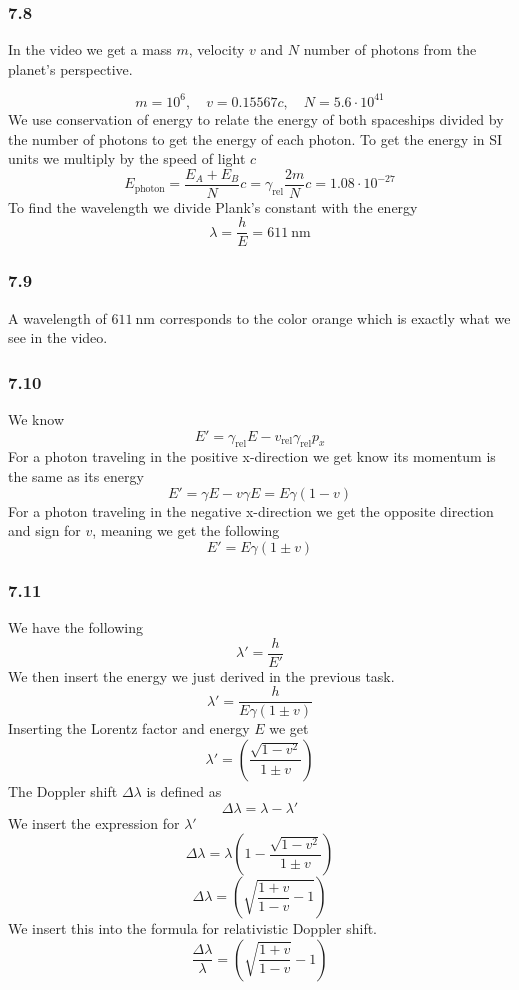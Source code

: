 \documentclass[reprint,english,notitlepage]{revtex4-2}
\begin{document}
\subsubsection*{7.8}
In the video we get a mass $ m $, velocity $ v $ and $ N $ number of photons from the planet's perspective. 

\[
m = 10^{6}, \quad v = 0.15567 c, \quad N = 5.6 ⋅ 10^{41}
\]
We use conservation of energy to relate the energy of both spaceships divided by the number of photons to get the energy of each photon. To get the energy in SI units we multiply by the speed of light $ c $
\[
E_{\text{photon}} = \frac{E_{A} + E_{B}}{N} c = γ_{\text{rel}} \frac{2m}{N}c = 1.08 ⋅ 10^{-27}
\]
To find the wavelength we divide Plank's constant with the energy 
\[
λ = \frac{h}{E} = 611\ \text{nm}
\]

\subsubsection*{7.9}
A wavelength of $  611\ \text{nm} $ corresponds to the color orange which is exactly what we see in the video.

\subsubsection*{7.10}
We know
\[
E' = γ_{\text{rel}}E - v_{\text{rel}} γ_{\text{rel}} p_{x}
\]
For a photon traveling in the positive x-direction we get know its momentum is the same as its energy
\[
E' = γE - v γ E = E γ(1 - v)
\]
For a photon traveling in the negative x-direction we get the opposite direction and sign for $ v $, meaning we get the following
\[
E' = E γ(1 ± v)
\]

\subsubsection*{7.11}
We have the following 
\[
λ' = \frac{h}{E'}
\]
We then insert the energy we just derived in the previous task. 
\[
λ' = \frac{h}{E γ(1 \pm v)}
\]
Inserting the Lorentz factor and energy $ E $ we get 
\[
λ' = \left( \frac{\sqrt{1 - v^{2}} }{1 \pm v} \right) 
\]
The Doppler shift $ Δλ $ is defined as
\[
Δλ = λ - λ' 
\]
We insert the expression for $ λ' $
\[
Δλ = λ\left( 1 - \frac{\sqrt{1 - v^{2}} }{1 \pm v} \right) 
\]
\[
Δλ = \left( \sqrt{\frac{1 + v}{1 - v} - 1}  \right) 
\]
We insert this into the formula for relativistic Doppler shift. 
\[
\frac{Δλ}{λ} = \left( \sqrt{\frac{1 + v}{1 - v}}  - 1 \right) 
\]
\end{document}
